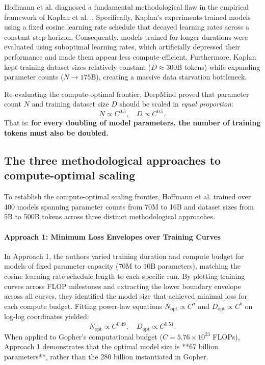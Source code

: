 \documentclass[../../main.tex]{subfiles}
\begin{document}
Hoffmann et al. diagnosed a fundamental methodological flaw in the empirical framework of Kaplan et al.~\cite{kaplan2020}. Specifically, Kaplan's experiments trained models using a fixed cosine learning rate schedule that decayed learning rates across a constant step horizon. Consequently, models trained for longer durations were evaluated using suboptimal learning rates, which artificially depressed their performance and made them appear less compute-efficient. Furthermore, Kaplan kept training dataset sizes relatively constant ($D \approx 300\text{B}$ tokens) while expanding parameter counts ($N \to 175\text{B}$), creating a massive data starvation bottleneck.

Re-evaluating the compute-optimal frontier, DeepMind proved that parameter count $N$ and training dataset size $D$ should be scaled in \emph{equal proportion}:
\begin{equation}
N \propto C^{0.5}, \quad D \propto C^{0.5}.
\label{eq:chinchilla_balanced_scaling}
\end{equation}
That is: \textbf{for every doubling of model parameters, the number of training tokens must also be doubled.}


\subsection{The three methodological approaches to compute-optimal scaling}
\label{subsec:chinchilla_three_approaches}

To establish the compute-optimal scaling frontier, Hoffmann et al. trained over 400 models spanning parameter counts from 70M to 16B and dataset sizes from 5B to 500B tokens across three distinct methodological approaches.

\paragraph{Approach 1: Minimum Loss Envelopes over Training Curves}
In Approach 1, the authors varied training duration and compute budget for models of fixed parameter capacity ($70\text{M}$ to $10\text{B}$ parameters), matching the cosine learning rate schedule length to each specific run. By plotting training curves across FLOP milestones and extracting the lower boundary envelope across all curves, they identified the model size that achieved minimal loss for each compute budget. Fitting power-law equations $N_{\text{opt}} \propto C^a$ and $D_{\text{opt}} \propto C^b$ on log-log coordinates yielded:
\begin{equation}
N_{\text{opt}} \propto C^{0.49}, \quad D_{\text{opt}} \propto C^{0.51}.
\label{eq:chinchilla_approach1_exponents}
\end{equation}
When applied to Gopher's computational budget ($C = 5.76 \times 10^{23}$ FLOPs), Approach 1 demonstrates that the optimal model size is **67 billion parameters**, rather than the 280 billion instantiated in Gopher.
\end{document}
